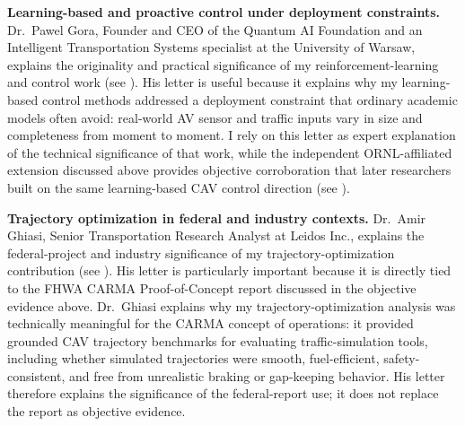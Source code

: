 \documentclass[11pt,letterpaper]{article}
\begin{document}
\textbf{Learning-based and proactive control under deployment constraints.} Dr.~Pawel Gora, Founder and CEO of the Quantum AI Foundation and an Intelligent Transportation Systems specialist at the University of Warsaw, explains the originality and practical significance of my reinforcement-learning and control work (see ). His letter is useful because it explains why my learning-based control methods addressed a deployment constraint that ordinary academic models often avoid: real-world AV sensor and traffic inputs vary in size and completeness from moment to moment. I rely on this letter as expert explanation of the technical significance of that work, while the independent ORNL-affiliated extension discussed above provides objective corroboration that later researchers built on the same learning-based CAV control direction (see ).

\textbf{Trajectory optimization in federal and industry contexts.} Dr.~Amir Ghiasi, Senior Transportation Research Analyst at Leidos Inc., explains the federal-project and industry significance of my trajectory-optimization contribution (see ). His letter is particularly important because it is directly tied to the FHWA CARMA Proof-of-Concept report discussed in the objective evidence above. Dr.~Ghiasi explains why my trajectory-optimization analysis was technically meaningful for the CARMA concept of operations: it provided grounded CAV trajectory benchmarks for evaluating traffic-simulation tools, including whether simulated trajectories were smooth, fuel-efficient, safety-consistent, and free from unrealistic braking or gap-keeping behavior. His letter therefore explains the significance of the federal-report use; it does not replace the report as objective evidence.
\end{document}
